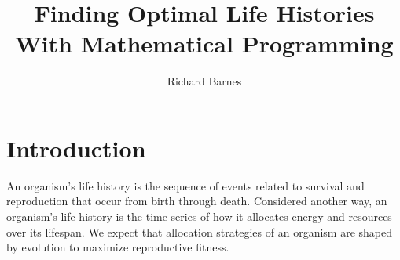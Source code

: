 \documentclass{article}
\title{Finding Optimal Life Histories With Mathematical Programming}
\author{Richard Barnes}
\date{}
\begin{document}
\maketitle

\tableofcontents

\section{Introduction}

An organism's life history is the sequence of events related to survival and reproduction that occur from birth through death. Considered another way, an organism's life history is the time series of how it allocates energy and resources over its lifespan. We expect that allocation strategies of an organism are shaped by evolution to maximize reproductive fitness.
\end{document}
